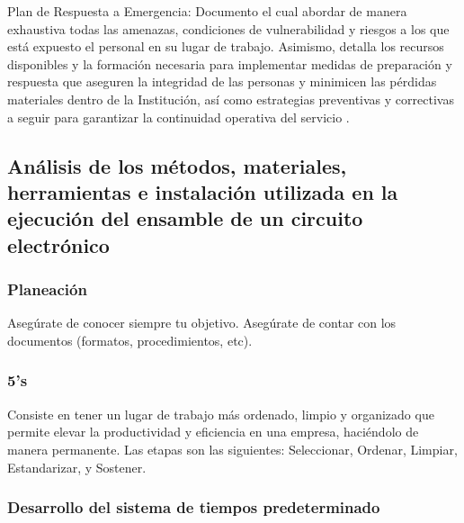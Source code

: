     Plan de Respuesta a Emergencia: Documento el cual abordar de manera exhaustiva todas las amenazas, condiciones de vulnerabilidad y riesgos a los que está expuesto el personal en su lugar de trabajo. Asimismo, detalla los recursos disponibles y la formación necesaria para implementar medidas de preparación y respuesta que aseguren la integridad de las personas y minimicen las pérdidas materiales dentro de la Institución, así como estrategias preventivas y correctivas a seguir para garantizar la continuidad operativa del servicio \cite{vra_ucr_emergencias}.
    
    \subsection{Análisis de los métodos, materiales, herramientas e instalación utilizada en la ejecución del ensamble de un circuito electrónico}
    \subsubsection{Planeación}
    
    Asegúrate de conocer siempre tu objetivo.
    Asegúrate de contar con los documentos (formatos, procedimientos, etc).
    \subsubsection{5's}
    Consiste en tener un lugar de trabajo
    más ordenado, limpio y organizado que
    permite elevar la productividad y
    eficiencia en una empresa, haciéndolo de manera permanente.
    Las etapas son las siguientes: Seleccionar, Ordenar, Limpiar, Estandarizar, y Sostener.
    \subsubsection{Desarrollo del sistema de tiempos predeterminado}
    
